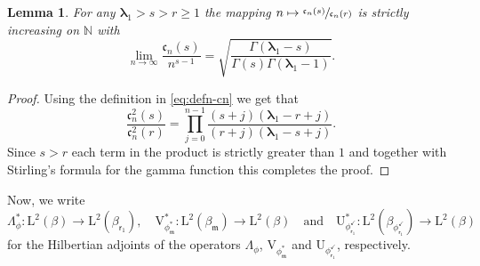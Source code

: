 \documentclass[10pt]{amsart}
\newcommand\mto{\mathchoice{\longmapsto}{\mapsto}{\mapsto}{\mapsto}}
\theoremstyle{plain}
\newtheorem{lemma}[theorem]{Lemma}
\theoremstyle{definition}
\newcommand{\N}{\mathbb{N}}
\newcommand{\Leb}{\mathrm{L}}
\newcommand{\m}{\mathfrak{m}}
\newcommand{\lam}{{\bm{\lambda}_1}}
\newcommand{\vat}{{\mathsf{r}_1}}
\newcommand{\phm}{{\phi_\m^*}}
\renewcommand{\varphi}{{\phi_{\vat}^{\checkmark}}}
\newcommand{\gab}[1][\lam,\mo]{{\beta_{#1}}}
\let\mo\mu
\let\bpsi\beta
\begin{document}
\begin{lemma}
\label{lem:seq-cn}
For any $\lam > s > r \geq 1$ the mapping $n \mto \sfrac{\mathfrak{c}_n(s)}{\mathfrak{c}_n(r)}$ is strictly increasing on $\N$ with
\begin{equation}
\label{eq:asymptotic-cn}
\lim_{n \to \infty} \frac{\mathfrak{c}_n(s)}{n^{s-1}} = \sqrt{\frac{\Gamma(\lam-s)}{\Gamma(s)\Gamma(\lam-1)}}.
\end{equation}
\end{lemma}

\begin{proof}
Using the definition in \eqref{eq:defn-cn} we get that
\begin{equation*}
\frac{\mathfrak{c}_n^2(s)}{\mathfrak{c}_n^2(r)} = \prod_{j=0}^{n-1} \frac{(s+j)(\lam-r+j)}{(r+j)(\lam-s+j)}.
\end{equation*}
Since $s > r$ each term in the product is strictly greater than $1$ and together with Stirling's formula for the gamma function this completes the proof.
\end{proof}

Now, we write
\[
\Lambda^*_{\phi} \colon \Leb^2(\beta) \to \Leb^2(\beta_{\vat}),\quad \mathrm{V}_{\phm}^* : \Leb^2(\gab[\m]) \to \Leb^2(\bpsi)\quad \text{and}\quad {\mathrm{U}}_\varphi^* : \Leb^2(\bpsi_\varphi) \to \Leb^2(\bpsi)
\]
for the Hilbertian adjoints of the operators
$\Lambda_{\phi}$, $\mathrm{V}_{\phm}$ and ${\mathrm{U}}_\varphi$, respectively.
\end{document}

